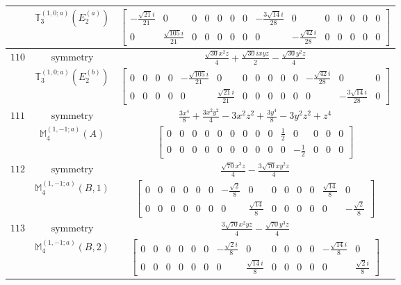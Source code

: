 \documentclass[fleqn,8pt,landscape]{jsarticle}
\begin{document}
\begin{longtable}{ccc}
$  $ & $ \mathbb{T}_{3}^{(1,0;a)}(E_{2}^{(a)}) $ & $ \begin{bmatrix} - \frac{\sqrt{21} i}{21} & 0 & 0 & 0 & 0 & 0 & 0 & - \frac{3 \sqrt{14} i}{28} & 0 & 0 & 0 & 0 & 0 & 0 \\ 0 & \frac{\sqrt{105} i}{21} & 0 & 0 & 0 & 0 & 0 & 0 & - \frac{\sqrt{42} i}{28} & 0 & 0 & 0 & 0 & 0 \end{bmatrix} $ \\ \hline
$ 110 $ & $ \text{symmetry} $ & $ \frac{\sqrt{30} x^{2} z}{4} + \frac{\sqrt{30} i x y z}{2} - \frac{\sqrt{30} y^{2} z}{4} $ \\
$  $ & $ \mathbb{T}_{3}^{(1,0;a)}(E_{2}^{(b)}) $ & $ \begin{bmatrix} 0 & 0 & 0 & 0 & - \frac{\sqrt{105} i}{21} & 0 & 0 & 0 & 0 & 0 & 0 & - \frac{\sqrt{42} i}{28} & 0 & 0 \\ 0 & 0 & 0 & 0 & 0 & \frac{\sqrt{21} i}{21} & 0 & 0 & 0 & 0 & 0 & 0 & - \frac{3 \sqrt{14} i}{28} & 0 \end{bmatrix} $ \\ \hline
$ 111 $ & $ \text{symmetry} $ & $ \frac{3 x^{4}}{8} + \frac{3 x^{2} y^{2}}{4} - 3 x^{2} z^{2} + \frac{3 y^{4}}{8} - 3 y^{2} z^{2} + z^{4} $ \\
$  $ & $ \mathbb{M}_{4}^{(1,-1;a)}(A) $ & $ \begin{bmatrix} 0 & 0 & 0 & 0 & 0 & 0 & 0 & 0 & 0 & \frac{1}{2} & 0 & 0 & 0 & 0 \\ 0 & 0 & 0 & 0 & 0 & 0 & 0 & 0 & 0 & 0 & - \frac{1}{2} & 0 & 0 & 0 \end{bmatrix} $ \\ \hline
$ 112 $ & $ \text{symmetry} $ & $ \frac{\sqrt{70} x^{3} z}{4} - \frac{3 \sqrt{70} x y^{2} z}{4} $ \\
$  $ & $ \mathbb{M}_{4}^{(1,-1;a)}(B,1) $ & $ \begin{bmatrix} 0 & 0 & 0 & 0 & 0 & 0 & - \frac{\sqrt{2}}{8} & 0 & 0 & 0 & 0 & 0 & \frac{\sqrt{14}}{8} & 0 \\ 0 & 0 & 0 & 0 & 0 & 0 & 0 & \frac{\sqrt{14}}{8} & 0 & 0 & 0 & 0 & 0 & - \frac{\sqrt{2}}{8} \end{bmatrix} $ \\ \hline
$ 113 $ & $ \text{symmetry} $ & $ \frac{3 \sqrt{70} x^{2} y z}{4} - \frac{\sqrt{70} y^{3} z}{4} $ \\
$  $ & $ \mathbb{M}_{4}^{(1,-1;a)}(B,2) $ & $ \begin{bmatrix} 0 & 0 & 0 & 0 & 0 & 0 & - \frac{\sqrt{2} i}{8} & 0 & 0 & 0 & 0 & 0 & - \frac{\sqrt{14} i}{8} & 0 \\ 0 & 0 & 0 & 0 & 0 & 0 & 0 & \frac{\sqrt{14} i}{8} & 0 & 0 & 0 & 0 & 0 & \frac{\sqrt{2} i}{8} \end{bmatrix} $ \\ \hline

\end{longtable}
\end{document}
